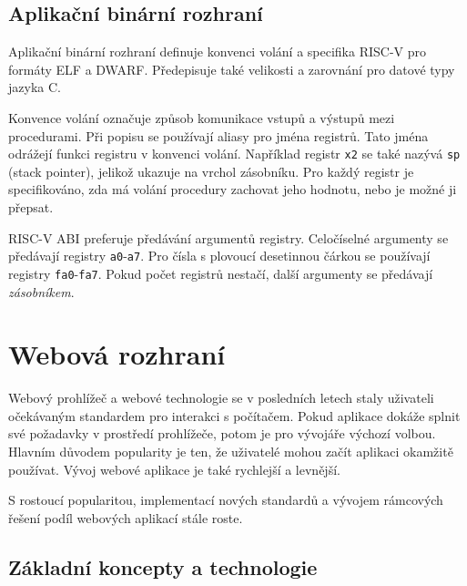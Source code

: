 
\section{Aplikační binární rozhraní}

Aplikační binární rozhraní definuje konvenci volání a specifika RISC-V pro formáty ELF a DWARF.
Předepisuje také velikosti a zarovnání pro datové typy jazyka C.
\cite{riscvabi}

Konvence volání označuje způsob komunikace vstupů a výstupů mezi procedurami.
Při popisu se používají aliasy pro jména registrů.
Tato jména odrážejí funkci registru v konvenci volání.
Například registr \texttt{x2} se také nazývá \texttt{sp} (stack pointer), jelikož ukazuje na vrchol zásobníku.
Pro každý registr je specifikováno, zda má volání procedury zachovat jeho hodnotu, nebo je možné ji přepsat.

RISC-V ABI preferuje předávání argumentů registry.
Celočíselné argumenty se předávají registry \texttt{a0}-\texttt{a7}.
Pro čísla s plovoucí desetinnou čárkou se používají registry \texttt{fa0}-\texttt{fa7}.
Pokud počet registrů nestačí, další argumenty se předávají \emph{zásobníkem}.

%
%

\chapter{Webová rozhraní}

Webový prohlížeč a webové technologie se v posledních letech staly uživateli očekávaným standardem pro interakci s počítačem.
Pokud aplikace dokáže splnit své požadavky v prostředí prohlížeče, potom je pro vývojáře výchozí volbou.
Hlavním důvodem popularity je ten, že uživatelé mohou začít aplikaci okamžitě používat.
Vývoj webové aplikace je také rychlejší a levnější.


S rostoucí popularitou, implementací nových standardů a vývojem rámcových řešení podíl webových aplikací stále roste.

\section{Základní koncepty a technologie}

